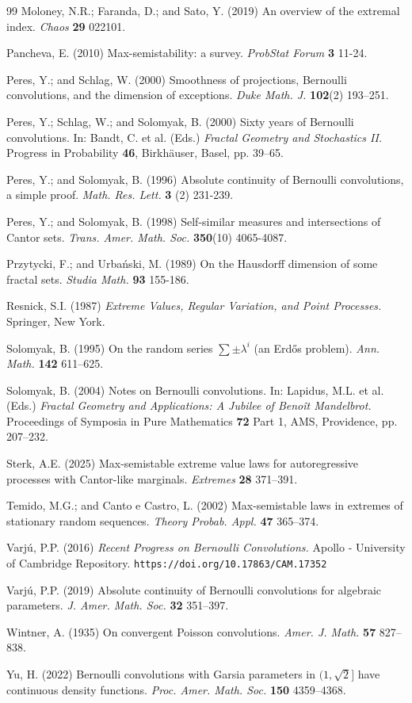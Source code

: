 \documentclass[12pt]{amsart}
\theoremstyle{definition}
\theoremstyle{remark}
\numberwithin{equation}{section}
\begin{document}
\begin{thebibliography}{99}
 Moloney, N.R.; Faranda, D.; and Sato, Y. (2019) An overview of the extremal index. {\it Chaos} {\bf 29} 022101.

 Pancheva, E. (2010) Max-semistability: a survey. {\it ProbStat Forum} {\bf 3} 11-24.

 Peres, Y.; and Schlag, W. (2000) Smoothness of projections, Bernoulli convolutions, and the dimension of exceptions. {\it Duke Math. J.} {\bf 102}(2) 193--251.

 Peres, Y.; Schlag, W.; and Solomyak, B. (2000) Sixty years of Bernoulli convolutions. In: Bandt, C. et al. (Eds.) {\it Fractal Geometry and Stochastics II.} Progress in Probability {\bf 46}, Birkh\"auser, Basel, pp. 39--65.

 Peres, Y.; and Solomyak, B. (1996) Absolute continuity of Bernoulli convolutions, a simple proof. {\it Math. Res. Lett.} {\bf 3} (2) 231-239.

  Peres, Y.; and Solomyak, B. (1998) Self-similar measures and intersections of Cantor sets. {\it Trans. Amer. Math. Soc.} {\bf 350}(10) 4065-4087.

 Przytycki, F.; and Urba\'nski, M. (1989) On the Hausdorff dimension of some fractal sets. {\it Studia Math.} {\bf 93} 155-186.

 Resnick, S.I. (1987) {\it Extreme Values, Regular Variation, and Point Processes.} Springer, New York.

 Solomyak, B. (1995) On the random series $\sum\pm\lambda^{i}$ (an Erd\H{o}s problem). {\it Ann. Math.} {\bf 142} 611--625.

 Solomyak, B. (2004) Notes on Bernoulli convolutions. In: Lapidus, M.L. et al. (Eds.) {\it Fractal Geometry and Applications: A Jubilee of Beno\^{i}t Mandelbrot.} Proceedings of Symposia in Pure Mathematics {\bf 72} Part 1, AMS, Providence, pp. 207--232.

 Sterk, A.E. (2025) Max-semistable extreme value laws for autoregressive processes with Cantor-like marginals. {\it Extremes} {\bf 28} 371--391.

 Temido, M.G.; and Canto e Castro, L. (2002) Max-semistable laws in extremes of stationary random sequences. {\it Theory Probab. Appl.} {\bf 47} 365--374.

 Varj\'u, P.P. (2016) {\it Recent Progress on Bernoulli Convolutions.} Apollo - University of Cambridge Repository. {\tt https://doi.org/10.17863/CAM.17352}

 Varj\'u, P.P. (2019) Absolute continuity of Bernoulli convolutions for algebraic parameters. {\it J. Amer. Math. Soc.} {\bf 32} 351--397.

 Wintner, A. (1935) On convergent Poisson convolutions. {\it Amer. J. Math.} {\bf 57} 827--838.

 Yu, H. (2022) Bernoulli convolutions with Garsia parameters in $(1,\sqrt{2}]$ have continuous density functions. {\it Proc. Amer. Math. Soc.} {\bf 150} 4359--4368.

\end{thebibliography}
\end{document}
